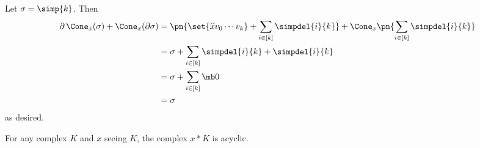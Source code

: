\begin{solution}
  Let $\sigma = \simp{k}$. Then
  \begin{align*}
    \partial\, \Cone_x(\sigma) + \Cone_x(\partial \sigma)
    &= \pn{\set{\widehat{x}v_0\cdots v_k} + \sum_{i\in [k]} \simpdel{i}{k}} + \Cone_x \pn{\sum_{i\in [k]} \simpdel{i}{k}} \\
    &= \sigma + \sum_{i\in [k]} \simpdel{i}{k} + \simpdel{i}{k} \\
    &= \sigma + \sum_{i \in [k]} \mb 0 \\
    &= \sigma
  \end{align*}
  as desired.
\end{solution}
\begin{problem}[16.12]
  For any complex $K$ and $x$ seeing $K$, the complex $x*K$ is acyclic.
\end{problem}
\begin{solution}

\end{solution}
\begin{problem}[16.13]

\end{problem}
\begin{solution}

\end{solution}
